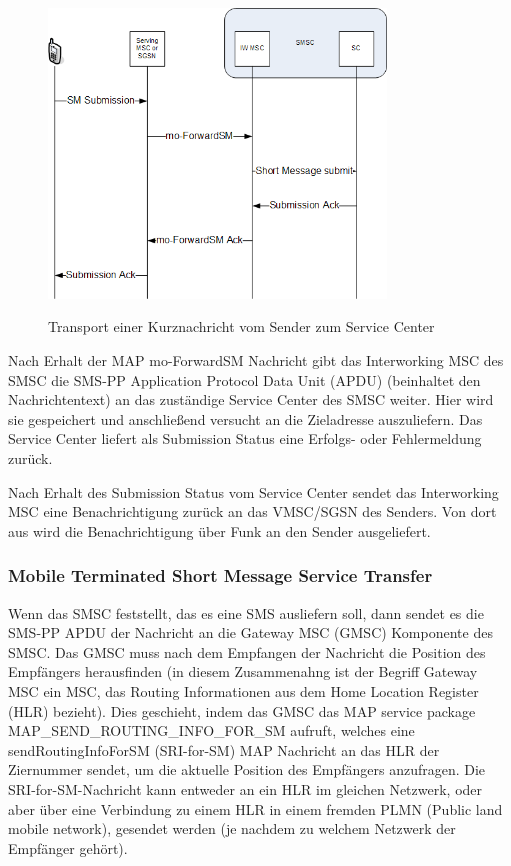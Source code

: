 \documentclass[german,12pt,a4paper]{article}
\begin{document}
\begin{figure}[htm]
    \centering
	\includegraphics[width=0.8\textwidth]{img/mo-forward-sm.png}
    \label{fig:mo-forward-sm}
    \caption{Transport einer Kurznachricht vom Sender zum Service Center}
\end{figure}	

Nach Erhalt der MAP mo-ForwardSM Nachricht gibt das Interworking MSC des SMSC die SMS-PP Application 
Protocol Data Unit (APDU) (beinhaltet den Nachrichtentext) an das zuständige Service Center des SMSC 
weiter. Hier wird sie gespeichert und anschließend versucht an die Zieladresse auszuliefern. Das 
Service Center liefert als Submission Status eine Erfolgs- oder Fehlermeldung zurück.

Nach Erhalt des Submission Status vom Service Center sendet das Interworking MSC eine Benachrichtigung
zurück an das VMSC/SGSN des Senders. Von dort aus wird die Benachrichtigung über Funk an den Sender
ausgeliefert.


\subsubsection{Mobile Terminated Short Message Service Transfer}
Wenn das SMSC feststellt, das es eine SMS ausliefern soll, dann sendet es die SMS-PP APDU der Nachricht 
an die Gateway MSC (GMSC) Komponente des SMSC. Das GMSC muss nach dem Empfangen der Nachricht die Position
des Empfängers herausfinden (in diesem Zusammenahng ist der Begriff Gateway MSC ein MSC, das Routing 
Informationen aus dem Home Location Register (HLR) bezieht). Dies geschieht, indem das GMSC das MAP service
package MAP\_SEND\_ROUTING\_INFO\_FOR\_SM aufruft, welches eine sendRoutingInfoForSM (SRI-for-SM) MAP 
Nachricht an das HLR der Ziernummer sendet, um die aktuelle Position des Empfängers anzufragen.
Die SRI-for-SM-Nachricht kann entweder an ein HLR im gleichen Netzwerk, oder aber über eine Verbindung zu
einem HLR in einem fremden PLMN (Public land mobile network), gesendet werden (je nachdem zu welchem 
Netzwerk der Empfänger gehört).
\end{document}
